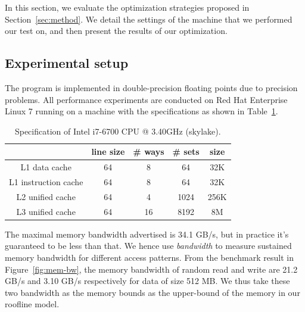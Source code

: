 
In this section, we evaluate the optimization strategies proposed in Section~\ref{sec:method}.
We detail the settings of the machine that we performed our test on, and then
present the results of our optimization.

\subsection{Experimental setup}

The program is implemented in double-precision floating points due to precision problems.
All performance experiments are conducted on Red Hat Enterprise Linux 7 running on a machine with the specifications as shown in Table~\ref{tab:cpu-info}.
\begin{table}
\begin{center}
\begin{tabular}{ | c | c | c | c | c | }
 \hline
     & line size & \# ways & \# sets  & size\\  \hline
 L1 data cache        & 64 &  8 &   64 & 32K \\  \hline
 L1 instruction cache & 64 &  8 &   64 & 32K \\  \hline
 L2 unified cache     & 64 &  4 & 1024 & 256K \\ \hline
 L3 unified cache     & 64 & 16 & 8192 & 8M \\  
 \hline
\end{tabular}
\caption{Specification of Intel i7-6700 CPU @ 3.40GHz (skylake).\cite{Intel_i7-6700}}
\label{tab:cpu-info}
\end{center}
\end{table}

The maximal memory bandwidth advertised is 34.1 GB/s, but in practice it's guaranteed to be less than that. We hence use \textit{bandwidth}\cite{bandwidth} to measure sustained memory bandwidth for different access patterns. From the benchmark result in Figure~\ref{fig:mem-bw}, the memory bandwidth of random read and write are 21.2 GB/s and 3.10 GB/s respectively for data of size 512 MB. We thus take these two bandwidth as the memory bounds as the upper-bound of the memory in our roofline model.

